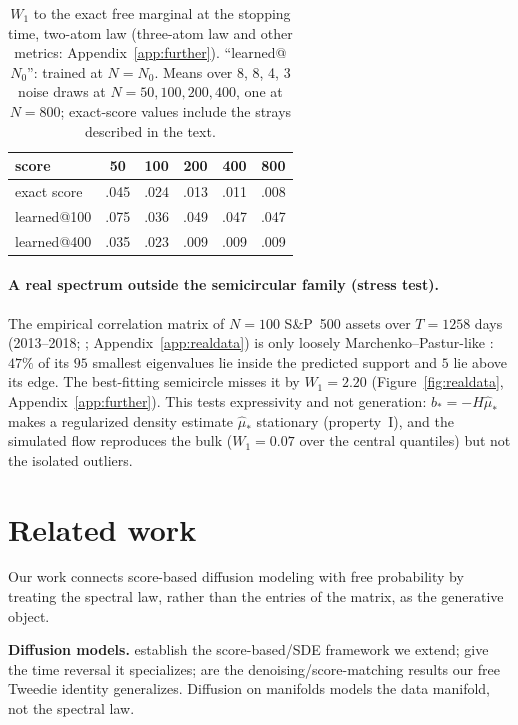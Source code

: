 \documentclass[11pt]{article}
\theoremstyle{plain}
\theoremstyle{definition}
\theoremstyle{remark}
\begin{document}
\begin{table}[h]
\centering
\caption{$W_1$ to the exact free marginal at the stopping time, two-atom law (three-atom law and other metrics: Appendix~\ref{app:further}). ``learned@$N_0$'': trained at $N=N_0$. Means over 8, 8, 4, 3 noise draws at $N=50,100,200,400$, one at $N=800$; exact-score values include the strays described in the text.}
\label{tab:crossn}
\footnotesize
\setlength{\tabcolsep}{3.5pt}
\begin{tabular}{@{}lccccc@{}}
\toprule
score & 50 & 100 & 200 & 400 & 800\\
\midrule
exact score & .045 & .024 & .013 & .011 & .008\\
learned@100 & .075 & .036 & .049 & .047 & .047\\
learned@400 & .035 & .023 & .009 & .009 & .009\\
\bottomrule
\end{tabular}
\end{table}

\paragraph{A real spectrum outside the semicircular family (stress test).} The empirical correlation matrix of
$N=100$ S\&P~500 assets over $T=1258$ days (2013--2018; \citealp{plotlydatasets}; Appendix~\ref{app:realdata}) is only
loosely Marchenko--Pastur-like \citep{Laloux1999,Plerou2002,Bun2017}: $47\%$ of its $95$ smallest eigenvalues lie inside the
predicted support and $5$ lie above its edge. The best-fitting semicircle misses it by $W_1=2.20$ (Figure~\ref{fig:realdata},
Appendix~\ref{app:further}). This tests expressivity and not generation: $b_*=-H\hat\mu_*$ makes a regularized density estimate
$\hat\mu_*$ stationary (property~I), and the simulated flow reproduces the bulk ($W_1=0.07$ over the central quantiles) but not the
isolated outliers.

\section{Related work}\label{sec:related}

Our work connects score-based diffusion modeling with free probability by treating the spectral law, rather
than the entries of the matrix, as the generative object.

\textbf{Diffusion models.} \citet{SohlDickstein2015,Ho2020,Song2021} establish the score-based/SDE
framework we extend; \citet{Anderson1982,Haussmann1986} give the time reversal it specializes;
\citet{Vincent2011,Hyvarinen2005} are the denoising/score-matching results our free Tweedie
identity generalizes. Diffusion on manifolds \citep{DeBortoli2022,Huang2022} models the data manifold, not the spectral law.
\end{document}
